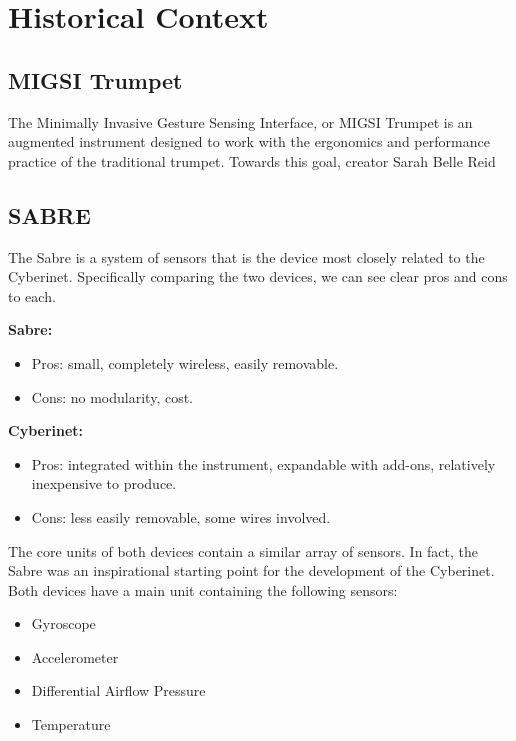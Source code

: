 \chapter{Historical Context}

\section{MIGSI Trumpet}
The Minimally Invasive Gesture Sensing Interface, or MIGSI Trumpet is an augmented instrument designed to work with the ergonomics and performance practice of the traditional trumpet. Towards this goal, creator Sarah Belle Reid 

\section{SABRE}
The Sabre is a system of sensors that is the device most closely related to the Cyberinet. Specifically comparing the two devices, we can see clear pros and cons to each.

\textbf{Sabre:}

\begin{itemize}
    \item Pros: small, completely wireless, easily removable.
    \item Cons: no modularity, cost.
\end{itemize}

\textbf{Cyberinet:} 

\begin{itemize}
    \item Pros: integrated within the instrument, expandable with add-ons, relatively inexpensive to produce.
    \item Cons: less easily removable, some wires involved.
\end{itemize}

The core units of both devices contain a similar array of sensors. In fact, the Sabre was an inspirational starting point for the development of the Cyberinet. Both devices have a main unit containing the following sensors:

\begin{itemize}
    \item Gyroscope
    \item Accelerometer 
    \item Differential Airflow Pressure
    \item Temperature
\end{itemize}

